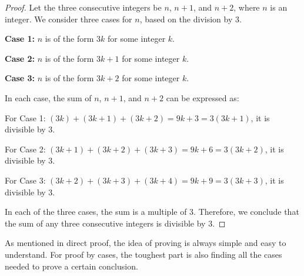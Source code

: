 \documentclass[
	12pt, %
	fleqn, %
	a4paper, %
]{LegrandOrangeBook}
\begin{document}
    \begin{proof}
            Let the three consecutive integers be \( n \), \( n+1 \), and \( n+2 \), where \( n \) is an integer. We consider three cases for \( n \), based on the division by 3.
            
            \textbf{Case 1:} \( n \) is of the form \( 3k \) for some integer \( k \).
            
            \textbf{Case 2:} \( n \) is of the form \( 3k + 1 \) for some integer \( k \).
            
            \textbf{Case 3:} \( n \) is of the form \( 3k + 2 \) for some integer \( k \).
            
            In each case, the sum of \( n \), \( n+1 \), and \( n+2 \) can be expressed as:
            
            For Case 1: \( (3k) + (3k + 1) + (3k + 2) = 9k + 3 = 3(3k + 1) \), it is divisible by 3.
            
            For Case 2: \( (3k + 1) + (3k + 2) + (3k + 3) = 9k + 6 = 3(3k + 2) \), it is divisible by 3.
            
            For Case 3: \( (3k + 2) + (3k + 3) + (3k + 4) = 9k + 9 = 3(3k + 3) \), it is divisible by 3.
            
            In each of the three cases, the sum is a multiple of 3. Therefore, we conclude that the sum of any three consecutive integers is divisible by 3.
            \end{proof}
            
\begin{remark}
    As mentioned in direct proof, the idea of proving is always simple and easy to understand. For proof by cases, the toughest part is also finding all the cases needed to prove a certain conclusion.
\end{remark}
\end{document}
